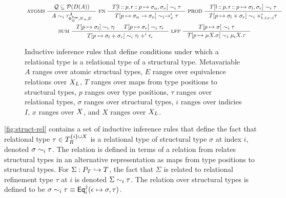 \begin{figure}
  \centering
  \begin{gather*}
    \inference[ ATOMS ]{
      \mathcal{ Q } \subseteq \pset(\domain(A)) }{
      A \hasreltype{i} \tau^A_{ \Phi_Q^{\true}, N_A, E } } 
    \inference[ FN ]{ 
      \upd{ T }{ %
        \leftchild \cons p, \rightchild \cons p }{ %
        \sigma_{\alpha}, \sigma_{\nu} } \hasreltype{i} \tau }{
      \upd{ T }{ p }{ \sigma_{\alpha} \to \sigma_{\nu} } \hasreltype{i}
      \to^i_x \tau } 
    \inference[ PROD ]{
      \upd{ T }{ %
        \leftchild \cons p, \rightchild \cons p }{ %
        \sigma_l, \sigma_r } \hasreltype{i} \tau }{
      \upd{ T }{ p }{ \sigma_l \times \sigma_r } \hasreltype{i}
      \times_{ \leftchild \cons i, \rightchild \cons i }^{i} \tau } \\
    \inference[ SUM ]{
      \upd{ T }{ p }{ \sigma_l } \hasreltype{i} \tau_l &
      \upd{ T }{ p }{ \sigma_r } \hasreltype{i} \tau_r }{
      \upd{ T }{ p }{ \sigma_l + \sigma_r } \hasreltype{i}
      \tau_l +^{i} \tau_r } 
    \inference[ LFP ]{
      \upd{ T }{ p }{ \sigma } \hasreltype{i} \tau }{
      \upd{ T }{ p }{ \mu X. \sigma } \hasreltype{i}
      \mu_i X. \tau }
  \end{gather*}
  \caption{Inductive inference rules that define conditions under which a relational type is a relational type of a structural type.
    Metavariable %
    $A$ ranges over atomic structual types, %
    $E$ ranges over equivalence relations over $X_L$, %
    $T$ ranges over maps from type positions to structural types, %
    $p$ ranges over type positions, %
    $\tau$ ranges over relational types, %
    $\sigma$ ranges over structural types, %
    $i$ ranges over indicies $I$, %
    $x$ ranges over $X$, and %
    $X$ ranges over $X_L$. }
  \label{fig:struct-rel}
\end{figure}

\autoref{fig:struct-rel} contains a set of inductive inference rules
that define the fact that relational type
$\tau \in T_{R}^{ \{ i \} \cup  X  }$ is a relational type of
structural type $\sigma$ at index $i$, denoted
$\sigma \sim_{i} \tau$.
%
The relation is defined in terms of a relation from relates structural
types in an alternative representation as maps from type positions to
structural types.
%
For $\Sigma: P_T \hookrightarrow T$, the fact that $\Sigma$ is related
to relational refinement type $\tau$ at $i$ is denoted
$\Sigma \sim_{i} \tau$.
%
The relation over structural types is defined to be
$\sigma \sim_{i} \tau \equiv \mathsf{Eq}_{i}^{j}(\epsilon \mapsto \sigma,
\tau)$.


